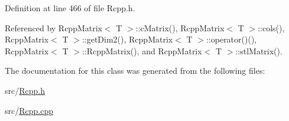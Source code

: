 Definition at line 466 of file Rcpp.h.

Referenced by RcppMatrix$<$ T $>$::cMatrix(), RcppMatrix$<$ T $>$::cols(), RcppMatrix$<$ T $>$::getDim2(), RcppMatrix$<$ T $>$::operator()(), RcppMatrix$<$ T $>$::RcppMatrix(), and RcppMatrix$<$ T $>$::stlMatrix().

The documentation for this class was generated from the following files:\begin{DoxyCompactItemize}
\item 
src/\hyperlink{Rcpp_8h}{Rcpp.h}\item 
src/\hyperlink{Rcpp_8cpp}{Rcpp.cpp}\end{DoxyCompactItemize}
